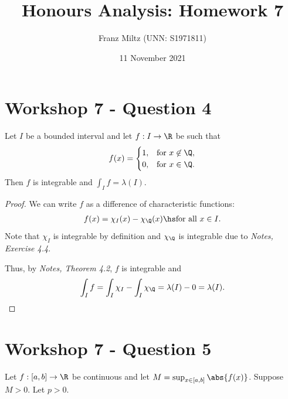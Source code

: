 \documentclass{article}
\begin{document}
\title{Honours Analysis: Homework 7}
\author{Franz Miltz (UNN: S1971811)}
\date{11 November 2021}
\maketitle

\section*{Workshop 7 - Question 4}

\begin{claim*}
   Let $I$ be a bounded interval and let $f:I\to\R$ be such that
   \begin{align*}
      f(x) = \begin{cases}
         1, & \text{for }x\not\in\Q, \\
         0, & \text{for }x\in\Q.
      \end{cases}
   \end{align*}
   Then $f$ is integrable and $\int_I f = \lambda(I)$.
\end{claim*}
\begin{proof}
   We can write $f$ as a difference of characteristic functions:
   \begin{align*}
      f(x) = \chi_I(x) - \chi_\Q(x)\hs\text{for all }x\in I.
   \end{align*}
   Note that $\chi_I$ is integrable by definition and $\chi_\Q$ is integrable due to
   \emph{Notes, Exercise 4.4}.

   Thus, by \emph{Notes, Theorem 4.2}, $f$ is integrable and
   \begin{align*}
      \int_I f = \int_I \chi_I - \int_I \chi_\Q = \lambda(I)-0 = \lambda(I).
   \end{align*}
\end{proof}

\section*{Workshop 7 - Question 5}

Let $f:[a,b]\to\R$ be continuous and let $M=\sup_{x\in[a,b]}\abs{f(x)}$. Suppose
$M>0$. Let $p>0$.
\end{document}
